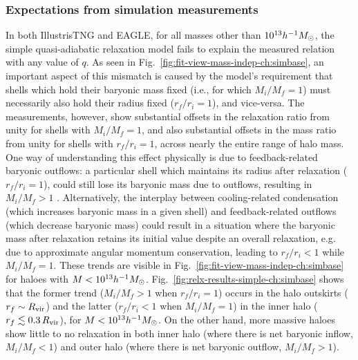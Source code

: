 \subsubsection{Expectations from simulation measurements}
\label{subsubsec:sim-relax-ch:simbase}
In both IllustrisTNG and EAGLE, for all masses other than $10^{13} h^{-1}M_{\odot}$, the simple quasi-adiabatic relaxation model  fails to explain the measured relation with any value of $q$. 
As seen in Fig.~\ref{fig:fit-view-mass-indep-ch:simbase}, an important aspect of this mismatch is caused by the model's requirement that shells which hold their baryonic mass fixed (i.e., for which $M_i/M_f=1$) must necessarily also hold their radius fixed ($r_f/r_i=1$), and vice-versa. The measurements, however, show substantial offsets in the relaxation ratio from unity for shells with $M_i/M_f = 1$, and also substantial offsets in the mass ratio from unity for shells with $r_f/r_i=1$, across nearly the entire range of halo mass. One way of understanding this effect physically is due to feedback-related baryonic outflows: a particular shell which maintains its radius after relaxation ($r_f/r_i=1$), could still lose its baryonic mass due to outflows, resulting in $M_i/M_f > 1$ \citep[][]{2022MNRAS.511.3910F}. Alternatively, the interplay between cooling-related condensation (which increases baryonic mass in a given shell) and feedback-related outflows (which decrease baryonic mass) could result in a situation where the baryonic mass after relaxation retains its initial value despite an overall relaxation, e.g. due to approximate angular momentum conservation, leading to $r_f/r_i < 1$ while $M_i/M_f=1$. These trends are visible  in  Fig.~\ref{fig:fit-view-mass-indep-ch:simbase}  for haloes with $M<10^{13}h^{-1}M_{\odot}$. Fig.~\ref{fig:relx-results-simple-ch:simbase} shows that the former trend ($M_i/M_f > 1$ when $r_f/r_i=1$) occurs in the halo outskirts ($r_f\sim R_{\rm vir}$) and the latter ($r_f/r_i < 1$ when $M_i/M_f=1$) in the inner halo ($r_f\lesssim0.3\,R_{\rm vir}$), for $M<10^{13}h^{-1}M_{\odot}$. 
On the other hand, more massive haloes show little to no relaxation in both inner halo (where there is net baryonic inflow, $M_i/M_f < 1$) and outer halo (where there is net baryonic outflow, $M_i/M_f > 1$).

